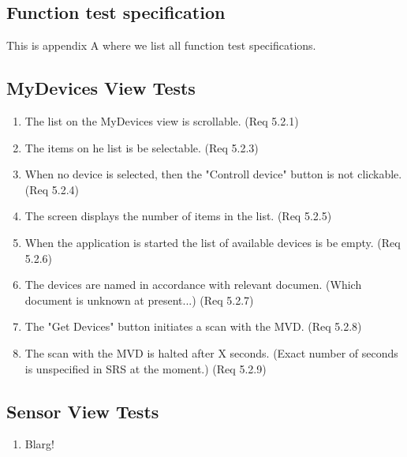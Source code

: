 \documentclass[a4paper]{article}
\newlength{\testlabellength}
\newenvironment{testlist}{\begin{enumerate}[label=\bfseries Test \thesubsection.\arabic* , labelindent=0pt, labelwidth=\testlabellength , leftmargin=2cm]}{\end{enumerate}}
\begin{document}
\newpage
\begin{appendices}

\section{Function test specification} \label{appendix:section:functiontest}
This is appendix A where we list all function test specifications.

%
%

\subsection{MyDevices View Tests}
\begin{testlist}
	\item The list on the MyDevices view is scrollable. (Req 5.2.1)
    \item The items on he list is be selectable. (Req 5.2.3)
    \item When no device is selected, then the "Controll device" button is not clickable. (Req 5.2.4)
    \item The screen displays the number of items in the list. (Req 5.2.5)
    \item When the application is started the list of available devices is be empty. (Req 5.2.6)
    \item The devices are named in accordance with relevant documen. (Which document is unknown at present...) (Req 5.2.7)
    \item The "Get Devices" button initiates a scan with the MVD. (Req 5.2.8)
    \item The scan with the MVD is halted after X seconds. (Exact number of seconds is unspecified in SRS at the moment.) (Req 5.2.9)
\end{testlist}

\subsection{Sensor View Tests}
\begin{testlist}
\item Blarg!
\end{testlist}


\end{appendices}
\end{document}
